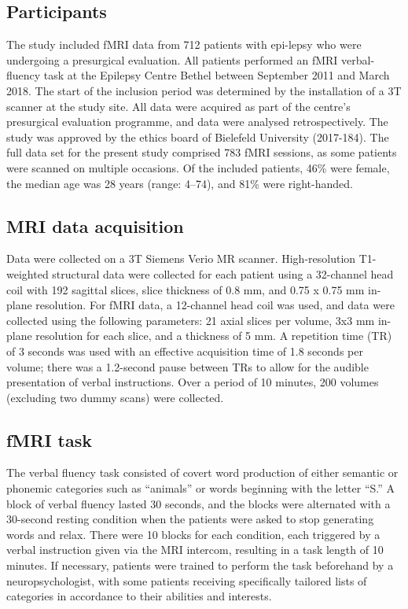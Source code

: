 \documentclass[fleqn,10pt]{SelfArx} %
\begin{document}
\subsection{Participants}
The study included fMRI data from 712 patients with epi-lepsy who were undergoing a presurgical evaluation. All patients performed an fMRI verbal-fluency task at the Epilepsy Centre Bethel between September 2011 and March 2018. The start of the inclusion period was determined by the installation of a 3T scanner at the study site. All data were acquired as part of the centre’s presurgical evaluation programme, and data were analysed retrospectively. The study was approved by the ethics board of Bielefeld University (2017-184). The full data set for the present study comprised 783 fMRI sessions, as some patients were scanned on multiple occasions. Of the included patients, 46\% were female, the median age was 28 years (range: 4–74), and 81\% were right-handed.

\subsection{MRI data acquisition}
Data were collected on a 3T Siemens Verio MR scanner. High-resolution T1-weighted structural data were collected for each patient using a 32-channel head coil with 192 sagittal slices, slice thickness of 0.8 mm, and 0.75 x 0.75 mm in-plane resolution. For fMRI data, a 12-channel head coil was used, and data were collected using the following parameters: 21 axial slices per volume, 3x3 mm in-plane resolution for each slice, and a thickness of 5 mm. A repetition time (TR) of 3 seconds was used with an effective acquisition time of 1.8 seconds per volume; there was a 1.2-second pause between TRs to allow for the audible presentation of verbal instructions. Over a period of 10 minutes, 200 volumes (excluding two dummy scans) were collected.

\subsection{fMRI task}
The verbal fluency task consisted of covert word production of either semantic or phonemic categories such as “animals” or words beginning with the letter “S.” A block of verbal fluency lasted 30 seconds, and the blocks were alternated with a 30-second resting condition when the patients were asked to stop generating words and relax. There were 10 blocks for each condition, each triggered by a verbal instruction given via the MRI intercom, resulting in a task length of 10 minutes. If necessary, patients were trained to perform the task beforehand by a neuropsychologist, with some patients receiving specifically tailored lists of categories in accordance to their abilities and interests.
\end{document}
